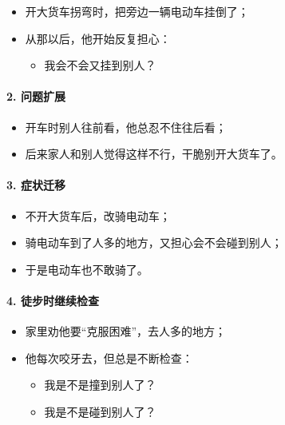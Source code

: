 \documentclass[
  chinese,
  9pt,
  a4paper,
]{ctexart}
\providecommand{\tightlist}{%
  \setlength{\itemsep}{0pt}\setlength{\parskip}{0pt}}
\begin{document}
\begin{itemize}
\item
  开大货车拐弯时，把旁边一辆电动车挂倒了；
\item
  从那以后，他开始反复担心：

  \begin{itemize}
  \tightlist
  \item
    我会不会又挂到别人？
  \end{itemize}
\end{itemize}

\paragraph{2. 问题扩展}\label{ux95eeux9898ux6269ux5c55}

\begin{itemize}
\tightlist
\item
  开车时别人往前看，他总忍不住往后看；
\item
  后来家人和别人觉得这样不行，干脆别开大货车了。
\end{itemize}

\paragraph{3. 症状迁移}\label{ux75c7ux72b6ux8fc1ux79fb}

\begin{itemize}
\tightlist
\item
  不开大货车后，改骑电动车；
\item
  骑电动车到了人多的地方，又担心会不会碰到别人；
\item
  于是电动车也不敢骑了。
\end{itemize}

\paragraph{4.
徒步时继续检查}\label{ux5f92ux6b65ux65f6ux7ee7ux7eedux68c0ux67e5}

\begin{itemize}
\item
  家里劝他要``克服困难''，去人多的地方；
\item
  他每次咬牙去，但总是不断检查：

  \begin{itemize}
  \tightlist
  \item
    我是不是撞到别人了？
  \item
    我是不是碰到别人了？
  \end{itemize}
\end{itemize}
\end{document}
